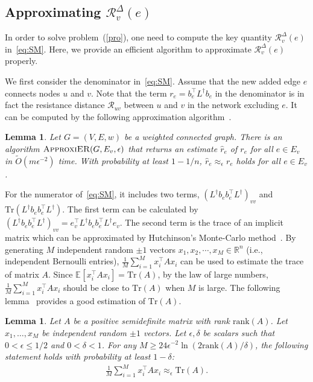 \documentclass{article}
\def\kh#1{\left( #1 \right)}
\newcommand{\eps}{\epsilon}
\newcommand\xx{\boldsymbol{\mathit{x}}}
\newcommand\bb{\boldsymbol{\mathit{b}}}
\newcommand\ee{\boldsymbol{\mathit{e}}}
\newcommand\LL{\bm{\mathit{L}}}
\renewcommand\AA{\boldsymbol{\mathit{A}}}
\newcommand\Otil{\widetilde{O}}
\def\trace#1{\mathrm{Tr} \left(#1 \right)}
\def\expec#1#2{{\mathbb{E}}_{#1}\left[ #2 \right]}
\newtheorem{lemma}[theo]{Lemma}
\begin{document}
\subsection{Approximating $\mathcal{R}_v^\Delta(e)$}

In order to solve problem~(\ref{pro}), one need to compute the key quantity  $\mathcal{R}_v^\Delta(e)$ in~\eqref{eq:SM}. Here, we provide an efficient algorithm to approximate  $\mathcal{R}_v^\Delta(e)$ properly. \par

We first consider the denominator in~\eqref{eq:SM}. Assume that the new added edge  $e$ connects  nodes $u$ and $v$.
Note that the term $r_e = \bb_e^\top \LL^\dag \bb_e$  in the denominator is in fact the  resistance distance $\mathcal{R}_{uv}$ between $u$ and $v$ in the network excluding $e$.  It can be computed by the following  approximation
algorithm~\cite{SS11}.

\begin{lemma}\label{lem:ERest}
Let $G = (V,E,w)$ be a weighted connected graph. There is an algorithm $\textsc{ApproxiER}(G, E_v,\eps)$ that
returns an estimate $\hat{r}_e$ of $r_e$ for all $e\in E_v$ in
	$\Otil(m \eps^{-2})$ time.
	With probability at least $1-1/n$, $\hat{r}_e \approx_{\eps} r_e$ holds
	for all $e\in E_v$.
\end{lemma}

For the numerator of~\eqref{eq:SM}, it includes two terms, $\kh{\LL^\dag \bb_e \bb_e^\top \LL^\dag}_{vv}$ and $\trace{\LL^\dag \bb_e \bb_e^\top \LL^\dag}$. The first term can be calculated by $\kh{\LL^\dag \bb_e \bb_e^\top \LL^\dag}_{vv} = \ee_v^\top \LL^\dag \bb_e \bb_e^\top \LL^\dag \ee_v$. The second term is the trace of an implicit matrix which can be approximated by Hutchinson's Monte-Carlo method~\cite{Hut89}. By generating $M$ independent random $\pm 1$ vectors $\xx_1, \xx_2, \cdots ,\xx_M \in \mathbb{R}^n$ (i.e., independent Bernoulli entries), $\frac{1}{M}\sum\nolimits_{i=1}^M \xx_i^\top \AA \xx_i$ can be used to estimate the trace of matrix $\AA$.
Since $\expec{}{\xx_i^\top \AA \xx_i} = \trace{\AA}$, by the law of large numbers,
$\frac{1}{M}\sum\nolimits_{i=1}^M \xx_i^\top \AA \xx_i$ should be close to $\trace{\AA}$ when $M$ is large.
The following lemma~\cite{AT11}  provides a good estimation of $\trace{\AA}$.
\begin{lemma}
\label{lem:mcL}
	Let $\AA$ be a positive semidefinite matrix with rank $\mathrm{rank}(\AA)$.
	Let $\xx_1,\ldots,\xx_M$ be independent random $\pm 1$ vectors.
	Let $\epsilon, \delta$ be scalars such that $0 < \epsilon \leq 1/2$
	and $0 < \delta < 1$.
	For any $M \geq 24\epsilon^{-2} \ln(2 \mathrm{rank}(\AA) / \delta)$,
	the following statement holds with probability at least $1 - \delta$:
\small
	\begin{align*}
		\frac{1}{M}\sum\limits_{i=1}^M \xx_i^\top \AA \xx_i \approx_\epsilon \trace{\AA}.
	\end{align*}
\normalsize
\end{lemma}
\end{document}
